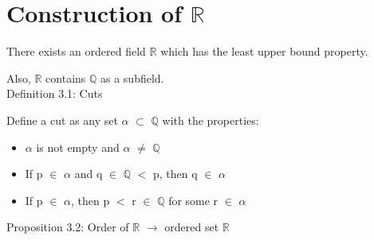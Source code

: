 \newpage
\section[Day 3: Existence of $\mathbb{R}$]{Construction of $\mathbb{R}$}

	\begin{adjustbox}{minipage=16cm, right, vspace=0.1cm 0cm}
		There exists an ordered field $\mathbb{R}$ which has the
		least upper bound property.

		Also, $\mathbb{R}$ contains $\mathbb{Q}$ as a subfield. \\
	\end{adjustbox}
	
{ \color{blue} Definition 3.1: Cuts }

	\begin{adjustbox}{minipage=16cm, right, vspace=0.1cm 0cm}
		Define a cut as any set $\alpha$ $\subset$ $\mathbb{Q}$ with the properties:
	\end{adjustbox}

	\begin{itemize}[leftmargin=2cm, itemsep=0.1cm]
		\item $\alpha$ is not empty and $\alpha$ $\not =$ $\mathbb{Q}$
		
		\item If p $\in$ $\alpha$ and q $\in$ $\mathbb{Q}$ $<$ p,
			then q $\in$ $\alpha$
		
			\item If p $\in$ $\alpha$, then p $<$ r $\in$ $\mathbb{Q}$ for
			some r $\in$ $\alpha$ \\
	\end{itemize}

{ \color{blue} Proposition 3.2: Order of $\mathbb{R}$ $\rightarrow$ ordered set $\mathbb{R}$ }

